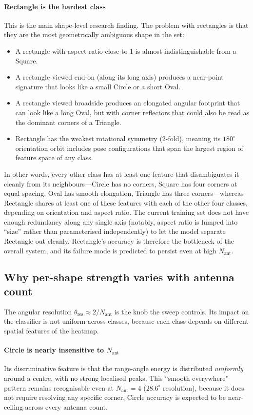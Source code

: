 \documentclass[letterpaper,11pt,leqno]{article}
\begin{document}
\paragraph{Rectangle is the hardest class} This is the main shape-level research finding. The problem with rectangles is that they are the most geometrically ambiguous shape in the set:
\begin{itemize}
\item A rectangle with aspect ratio close to 1 is almost indistinguishable from a Square.
\item A rectangle viewed end-on (along its long axis) produces a near-point signature that looks like a small Circle or a short Oval.
\item A rectangle viewed broadside produces an elongated angular footprint that can look like a long Oval, but with corner reflectors that could also be read as the dominant corners of a Triangle.
\item Rectangle has the weakest rotational symmetry (2-fold), meaning its $180^\circ$ orientation orbit includes pose configurations that span the largest region of feature space of any class.
\end{itemize}

In other words, every other class has at least one feature that disambiguates it cleanly from its neighbours---Circle has no corners, Square has four corners at equal spacing, Oval has smooth elongation, Triangle has three corners---whereas Rectangle shares at least one of these features with each of the other four classes, depending on orientation and aspect ratio. The current training set does not have enough redundancy along any single axis (notably, aspect ratio is lumped into ``size'' rather than parameterised independently) to let the model separate Rectangle out cleanly. Rectangle's accuracy is therefore the bottleneck of the overall system, and its failure mode is predicted to persist even at high $N_{\mathrm{ant}}$.

\subsection{Why per-shape strength varies with antenna count}

The angular resolution $\theta_{\mathrm{res}}\approx 2/N_{\mathrm{ant}}$ is the knob the sweep controls. Its impact on the classifier is not uniform across classes, because each class depends on different spatial features of the heatmap.

\paragraph{Circle is nearly insensitive to $N_{\mathrm{ant}}$} Its discriminative feature is that the range-angle energy is distributed \emph{uniformly} around a centre, with no strong localised peaks. This ``smooth everywhere'' pattern remains recognisable even at $N_{\mathrm{ant}}=4$ ($28.6^\circ$ resolution), because it does not require resolving any specific corner. Circle accuracy is expected to be near-ceiling across every antenna count.
\end{document}
